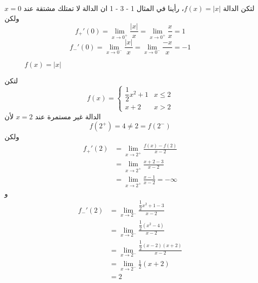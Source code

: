 \begin{example}
	لتكن الدالة $f(x) = |x|$، رأينا في المثال 1 - 3 - 1 ان الدالة لا تمتلك مشتقة عند  $x=0$ ولكن
	\[
f_+'(0) = \lim\limits_{x\to0^+} \frac{|x|}{x} = \lim\limits_{x\to0^+} \frac{x}{x} =1
\]
\[
f_-'(0) = \lim\limits_{x\to0^-} \frac{|x|}{x} = \lim\limits_{x\to0^-} \frac{-x}{x}=- 1
\]

\begin{figure}[H]
	\centering
	\caption{$f(x) = |x|$}
\end{figure}
\newpage
\end{example}

\begin{example}
	لتكن 
\[
f(x)=
\begin{cases}
	\dfrac{1}{2}x^2 + 1 & x\leq 2 \\
	x+2 & x>2
\end{cases}
\]	
الدالة غير مستمرة عند $x=2$ لأن 
\[
f(2^+) = 4 \neq 2 = f(2^-)
\]
ولكن 
\begin{align*}
	f_+'(2) &= \lim\limits_{x\to 2^+} \frac{f(x) - f(2)}{x-2} \\
	&= \lim\limits_{x\to 2^+} \frac{x+2-3}{x-2} \\
	&= \lim\limits_{x\to2^+} \frac{x-1}{x-2} = -\infty
\end{align*}
و
\begin{align*}
	f_-'(2) &= \lim\limits_{x\to 2^-} \frac{\dfrac{1}{2} x^2 +1 -3}{x-2}\\
	&= \lim\limits_{x\to 2^-} \frac{\dfrac{1}{2}(x^2-4)}{x-2} \\
	&= \lim\limits_{x\to 2^-} \frac{\dfrac{1}{2}(x-2)(x+2)}{x-2}\\
	&= \lim\limits_{x\to 2^-} \frac{1}{2}(x+2)\\
	&= 2
\end{align*}
\begin{figure}[H]
		\centering
		\caption{}
\end{figure}
\end{example}


